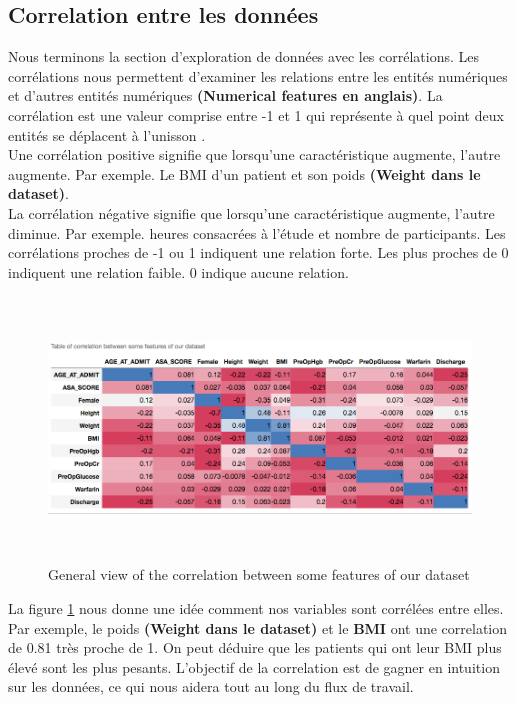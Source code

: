 \documentclass[12pt, french]{report}
\begin{document}
\subsection{Correlation entre les données}
Nous terminons la section d'exploration de données avec les corrélations. Les corrélations nous permettent d'examiner les relations entre les entités numériques et d'autres entités numériques \textbf{(Numerical features en anglais)}. La corrélation est une valeur comprise entre -1 et 1 qui représente à quel point deux entités se déplacent à l'unisson \cite{key20}. \\

Une corrélation positive signifie que lorsqu'une caractéristique augmente, l'autre augmente. Par exemple. Le BMI d'un patient et son poids\textbf{ (Weight dans le dataset)}.\\

La corrélation négative signifie que lorsqu'une caractéristique augmente, l'autre diminue. Par exemple. heures consacrées à l'étude et nombre de participants. Les corrélations proches de -1 ou 1 indiquent une relation forte. Les plus proches de 0 indiquent une relation faible. 0 indique aucune relation.

\begin{figure}[h]
\includegraphics[width=17.5cm, height =7cm]{images/correlation.png}
\caption{General view of the correlation between some features of our dataset}
\label{fig:correlation}
\end{figure}

La figure \ref{fig:correlation} nous donne une idée comment nos variables sont corrélées entre elles. Par exemple, le poids \textbf{ (Weight dans le dataset)} et le \textbf{BMI} ont une correlation de 0.81 très proche de 1. On peut déduire que les patients qui ont leur BMI plus élevé sont les plus pesants. L'objectif de la correlation est de gagner en intuition sur les données, ce qui nous aidera tout au long du flux de travail.\\ 
\end{document}
